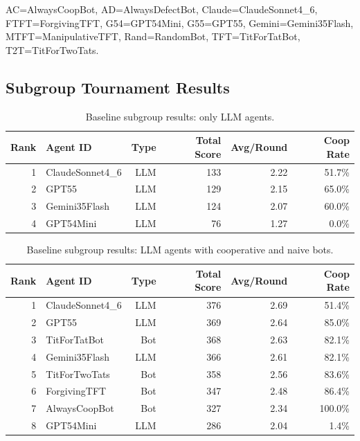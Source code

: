 \documentclass[11pt]{article}
\begin{document}
\begin{table}[H]
\vspace{0.3em}
\begin{flushleft}
\scriptsize
AC=AlwaysCoopBot, AD=AlwaysDefectBot, Claude=ClaudeSonnet4\_6, FTFT=ForgivingTFT, G54=GPT54Mini, G55=GPT55, Gemini=Gemini35Flash, MTFT=ManipulativeTFT, Rand=RandomBot, TFT=TitForTatBot, T2T=TitForTwoTats.
\end{flushleft}
\end{table}

\subsection{Subgroup Tournament Results}

\begin{table}[H]
\centering
\caption{Baseline subgroup results: only LLM agents.}
\label{tab:baseline_subgroup_llm_only}
\begin{tabular}{rlrrrr}
\toprule
Rank & Agent ID & Type & Total Score & Avg/Round & Coop Rate \\
\midrule
1 & ClaudeSonnet4\_6 & LLM & 133 & 2.22 & 51.7\% \\
2 & GPT55 & LLM & 129 & 2.15 & 65.0\% \\
3 & Gemini35Flash & LLM & 124 & 2.07 & 60.0\% \\
4 & GPT54Mini & LLM & 76 & 1.27 & 0.0\% \\
\bottomrule
\end{tabular}
\end{table}

\begin{table}[H]
\centering
\caption{Baseline subgroup results: LLM agents with cooperative and naive bots.}
\label{tab:baseline_subgroup_llm_cooperative}
\begin{tabular}{rlrrrr}
\toprule
Rank & Agent ID & Type & Total Score & Avg/Round & Coop Rate \\
\midrule
1 & ClaudeSonnet4\_6 & LLM & 376 & 2.69 & 51.4\% \\
2 & GPT55 & LLM & 369 & 2.64 & 85.0\% \\
3 & TitForTatBot & Bot & 368 & 2.63 & 82.1\% \\
4 & Gemini35Flash & LLM & 366 & 2.61 & 82.1\% \\
5 & TitForTwoTats & Bot & 358 & 2.56 & 83.6\% \\
6 & ForgivingTFT & Bot & 347 & 2.48 & 86.4\% \\
7 & AlwaysCoopBot & Bot & 327 & 2.34 & 100.0\% \\
8 & GPT54Mini & LLM & 286 & 2.04 & 1.4\% \\
\bottomrule
\end{tabular}
\end{table}
\end{document}
